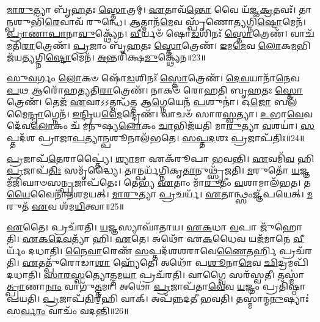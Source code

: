 \-\ul{𑌮𑌾}\-\-\ul{𑌰𑍁}\-𑌤𑍍𑌯𑌾 𑌬𑍃᳴\-\ul{𑌹}\-𑌤𑌃 \ul{𑌸𑍍𑌤𑍋}\-𑌤𑍍𑌰𑌮𑍍।
\-\ul{𑌏}\-𑌤𑌾𑌵᳴\-\ul{𑌨𑍍𑌤𑍋} 𑌵𑍈 𑌯᳴𑌜𑍍𑌞\-\ul{𑌕𑍍𑌰}\-𑌤𑌵𑌃᳴।
𑌤𑌾\-\ul{𑌨𑍍𑌪}\-𑌶𑍁𑌭𑌿᳴\-\ul{𑌰𑍇}\-𑌵𑌾𑌵᳴ 𑌰𑍁𑌨𑍍𑌧𑍇।
\-\ul{𑌆}\-𑌤𑍍𑌮𑌾𑌨᳴\-\ul{𑌮𑍇}\-𑌵 𑌸𑍍𑌪𑍃᳴𑌣𑍋𑌤𑍍𑌯𑌗𑍍𑌨𑌿\-\ul{𑌷𑍍𑌟𑍋}\-𑌮𑍇𑌨᳴।
\-\ul{𑌪𑍍𑌰𑌾}\-\-\ul{𑌣𑌾}\-\-\ul{𑌪𑌾}\-𑌨𑌾\-\ul{𑌵𑍁}\-𑌕𑍍𑌥𑍍𑌯𑍇᳴𑌨।
\-\ul{𑌵𑍀}\-𑌰𑍍𑌯𑍞᳴ 𑌷𑍋\-\ul{𑌡}\-𑌶𑌿𑌨𑌃᳴ \ul{𑌸𑍍𑌤𑍋}\-𑌤𑍍𑌰𑍇𑌣᳴।
𑌵𑌾𑌚᳴𑌮𑌤𑌿\-\ul{𑌰𑌾}\-𑌤𑍍𑌰𑍇𑌣᳴।
\-\ul{𑌪𑍍𑌰}\-𑌜𑌾𑌂 𑌬𑍃᳴\-\ul{𑌹}\-𑌤𑌃 \ul{𑌸𑍍𑌤𑍋}\-𑌤𑍍𑌰𑍇𑌣᳴।
\-\ul{𑌇}\-𑌮\-\ul{𑌮𑍇}\-𑌵 \ul{𑌲𑍋}\-𑌕\-\ul{𑌮}\-𑌭𑌿𑌜᳴𑌯𑌤𑍍𑌯𑌗𑍍𑌨𑌿\-\ul{𑌷𑍍𑌟𑍋}\-𑌮𑍇𑌨᳴।
\-\ul{𑌅}\-𑌨𑍍𑌤𑌰𑌿᳴𑌕𑍍𑌷\-\ul{𑌮𑍁}\-𑌕𑍍𑌥𑍍𑌯𑍇᳴𑌨॥23॥

\-\ul{𑌸𑍁}\-\-\ul{𑌵}\-𑌰𑍍𑌗𑌂 \ul{𑌲𑍋}\-𑌕𑍞 𑌷𑍋᳴\-\ul{𑌡}\-𑌶𑌿𑌨𑌃᳴ \ul{𑌸𑍍𑌤𑍋}\-𑌤𑍍𑌰𑍇𑌣᳴।
\-\ul{𑌦𑍇}\-\-\ul{𑌵}\-𑌯𑌾𑌨𑌾᳴\-\ul{𑌨𑍇}\-𑌵 \ul{𑌪}\-𑌥 𑌆𑌰𑍋᳴𑌹𑌤𑍍𑌯𑌤𑌿\-\ul{𑌰𑌾}\-𑌤𑍍𑌰𑍇𑌣᳴।
𑌨𑌾𑌕𑍞᳴ 𑌰𑍋𑌹𑌤𑌿 𑌬𑍃\-\ul{𑌹}\-𑌤𑌃 \ul{𑌸𑍍𑌤𑍋}\-𑌤𑍍𑌰𑍇𑌣᳴।
𑌤𑍇𑌜᳴ \ul{𑌏}\-𑌵𑌾𑌽𑌽𑌤𑍍𑌮𑌨𑍍𑌧᳴𑌤𑍍𑌤 𑌆\-\ul{𑌗𑍍𑌨𑍇}\-𑌯𑍇𑌨᳴ \ul{𑌪}\-𑌶𑍁𑌨𑌾॑।
𑌓\-\ul{𑌜𑍋} 𑌬𑌲᳴𑌮𑍈\-\ul{𑌨𑍍𑌦𑍍𑌰𑌾}\-𑌗𑍍𑌨𑍇𑌨᳴।
\-\ul{𑌇}\-\-\ul{𑌨𑍍𑌦𑍍𑌰𑌿}\-𑌯\-\ul{𑌮𑍈}\-𑌨𑍍𑌦𑍍𑌰𑍇𑌣᳴।
𑌵𑌾𑌚𑍞᳴ 𑌸𑌾𑌰\-\ul{𑌸𑍍𑌵}\-𑌤𑍍𑌯𑌾।
\-\ul{𑌉}\-𑌭𑌾\-\ul{𑌵𑍇}\-𑌵 𑌦𑍇᳴𑌵\-\ul{𑌲𑍋}\-𑌕𑌂 𑌚᳴ 𑌮𑌨𑍁𑌷𑍍𑌯\-\ul{𑌲𑍋}\-𑌕𑌂 \ul{𑌚𑌾}\-𑌭𑌿𑌜᳴𑌯𑌤𑌿 𑌮𑌾\-\ul{𑌰𑍁}\-𑌤𑍍𑌯𑌾 \ul{𑌵}\-𑌶𑌯𑌾॑।
\-\ul{𑌸}\-𑌪𑍍𑌤𑌦᳴𑌶 𑌪𑍍𑌰𑌾𑌜𑌾\-\ul{𑌪}\-𑌤𑍍𑌯𑌾\-\ul{𑌨𑍍𑌪}\-𑌶𑍂𑌨𑌾𑌲᳴𑌭𑌤𑍇।
\-\ul{𑌸}\-\-\ul{𑌪𑍍𑌤}\-\-\ul{𑌦}\-𑌶𑌃 \ul{𑌪𑍍𑌰}\-𑌜𑌾\-𑌪᳴𑌤𑌿𑌃॥24॥

\-\ul{𑌪𑍍𑌰}\-𑌜𑌾𑌪᳴\-\ul{𑌤𑍇}\-𑌰𑌾𑌪𑍍𑌤𑍍𑌯𑍈॑।
\-\ul{𑌶𑍍𑌯𑌾}\-𑌮𑌾 𑌏𑌕᳴𑌰𑍂𑌪𑌾 𑌭𑌵𑌨𑍍𑌤𑌿।
\-\ul{𑌏}\-𑌵𑌮𑌿᳴\-\ul{𑌵} 𑌹𑌿 \ul{𑌪𑍍𑌰}\-𑌜𑌾\-𑌪᳴\-\ul{𑌤𑌿𑌃} 𑌸𑌮𑍃᳴𑌦𑍍𑌧𑍍𑌯𑍈।
𑌤𑌾𑌨𑍍𑌪𑌰𑍍𑌯᳴𑌗𑍍𑌨𑌿𑌕𑍃\-\ul{𑌤𑌾}\-𑌨𑍁𑌥𑍍𑌸𑍃᳴𑌜𑌤𑌿।
\-\ul{𑌮}\-𑌰𑍁𑌤𑍋᳴ \ul{𑌯}\-𑌜𑍍𑌞𑌮᳴𑌜𑌿𑌘𑌾𑍞𑌸\-\ul{𑌨𑍍𑌪𑍍𑌰}\-𑌜𑌾𑌪᳴𑌤𑍇𑌃।
𑌤𑍇𑌭𑍍𑌯᳴ \ul{𑌏}\-𑌤𑌾𑌂 𑌮𑌾᳴\-\ul{𑌰𑍁}\-𑌤𑍀𑌂 \ul{𑌵}\-𑌶𑌾𑌮𑌾𑌲᳴𑌭𑌤।
𑌤\-\ul{𑌯𑍈}\-𑌵𑍈𑌨𑌾᳴𑌨𑌶𑌮𑌯𑌤𑍍।
\-\ul{𑌮𑌾}\-\-\ul{𑌰𑍁}\-𑌤𑍍𑌯𑌾 \ul{𑌪𑍍𑌰}\-𑌚𑌰𑍍𑌯᳴।
\-\ul{𑌏}\-𑌤𑌾𑌨𑍍𑌥𑍍𑌸𑌂𑌜𑍍𑌞᳴𑌪𑌯𑍇𑌤𑍍।
\-\ul{𑌮}\-𑌰𑍁𑌤᳴ \ul{𑌏}\-𑌵 𑌶᳴𑌮\-\ul{𑌯𑌿}\-𑌤𑍍𑌵𑌾॥25॥

\-\ul{𑌏}\-𑌤𑍈𑌃 𑌪𑍍𑌰𑌚᳴𑌰𑌤𑌿।
\-\ul{𑌯}\-𑌜𑍍𑌞𑌸𑍍𑌯𑌾𑌘𑌾᳴𑌤𑌾𑌯।
\-\ul{𑌏}\-\-\ul{𑌕}\-𑌧𑌾 \ul{𑌵}\-𑌪𑌾 𑌜𑍁᳴𑌹𑍋𑌤𑌿।
\-\ul{𑌏}\-\-\ul{𑌕}\-\-\ul{𑌦𑍇}\-\-\ul{𑌵}\-𑌤𑍍𑌯𑌾᳴ 𑌹𑌿।
\-\ul{𑌏}\-𑌤𑍇।
𑌅𑌥𑍋᳴ 𑌏\-\ul{𑌕}\-𑌧𑍈𑌵 𑌯𑌜᳴𑌮𑌾𑌨𑍇 \ul{𑌵𑍀}\-𑌰𑍍𑌯𑌂᳴ 𑌦𑌧𑌾𑌤𑌿।
\-\ul{𑌨𑍈}\-\-\ul{𑌵𑌾}\-𑌰𑍇𑌣᳴ \ul{𑌸}\-𑌪𑍍𑌤𑌦᳴𑌶𑌶𑌰𑌾𑌵𑍇\-\ul{𑌣𑍈}\-𑌤𑌰𑍍\mbox{}\-\ul{𑌹𑌿} 𑌪𑍍𑌰𑌚᳴𑌰𑌤𑌿।
\-\ul{𑌏}\-𑌤𑌤𑍍𑌪𑍁᳴𑌰𑍋𑌡𑌾\-\ul{𑌶𑌾} 𑌹𑍍𑌯𑍇᳴𑌤𑍇।
𑌅𑌥𑍋᳴ 𑌪\-\ul{𑌶𑍂}\-𑌨𑌾\-\ul{𑌮𑍇}\-𑌵 \ul{𑌛𑌿}\-𑌦𑍍𑌰𑌮𑌪𑌿᳴𑌦𑌧𑌾𑌤𑌿।
\-\ul{𑌸𑌾}\-\-\ul{𑌰}\-\-\ul{𑌸𑍍𑌵}\-𑌤𑍍𑌯𑍋\-\ul{𑌤𑍍𑌤}\-𑌮\-\ul{𑌯𑌾} 𑌪𑍍𑌰𑌚᳴𑌰𑌤𑌿।
𑌵𑌾𑌗𑍍𑌵𑍈 𑌸𑌰᳴𑌸𑍍𑌵𑌤𑍀।
𑌤𑌸𑍍𑌮𑌾॑\-\ul{𑌤𑍍𑌪𑍍𑌰𑌾}\-𑌣𑌾\-\ul{𑌨𑌾𑌂} 𑌵𑌾𑌗𑍁᳴\-\ul{𑌤𑍍𑌤}\-𑌮𑌾।
𑌅𑌥𑍋॑ \ul{𑌪𑍍𑌰}\-𑌜𑌾𑌪᳴𑌤𑌾\-\ul{𑌵𑍇}\-𑌵 \ul{𑌯}\-𑌜𑍍𑌞𑌂 𑌪𑍍𑌰𑌤𑌿᳴\-𑌷𑍍𑌠𑌾𑌪𑌯𑌤𑌿।
\-\ul{𑌪𑍍𑌰}\-𑌜𑌾𑌪᳴\-\ul{𑌤𑌿}\-𑌰𑍍‌॒\mbox{}𑌹𑌿 𑌵𑌾𑌕𑍍।
𑌅𑌪᳴𑌨𑍍𑌨𑌦𑌤𑍀 𑌭𑌵𑌤𑌿।
𑌤𑌸𑍍𑌮𑌾॑𑌨𑍍𑌮\-\ul{𑌨𑍁}\-𑌷𑍍𑌯𑌾𑌃॑ 𑌸\-\ul{𑌰𑍍𑌵𑌾𑌂} 𑌵𑌾𑌚𑌂᳴ 𑌵𑌦𑌨𑍍𑌤𑌿॥26॥\anuvakamend[\-\ul{𑌅}\-\-\ul{𑌤𑌿}\-\-\ul{𑌰𑌾}\-𑌤𑍍𑌰\-\ul{𑌮}\-𑌨𑍍𑌤𑌰𑌿᳴𑌕𑍍𑌷\-\ul{𑌮𑍁}\-𑌕𑍍𑌥𑍍𑌯𑍇᳴𑌨 \ul{𑌪𑍍𑌰}\-𑌜𑌾\-𑌪᳴𑌤𑌿𑌃 𑌶𑌮\-\ul{𑌯𑌿}\-𑌤𑍍𑌵𑍋\-\ul{𑌤𑍍𑌤}\-𑌮\-\ul{𑌯𑌾} 𑌪𑍍𑌰𑌚᳴𑌰\-\ul{𑌤𑌿} 𑌷𑌟𑍍 𑌚᳴]

